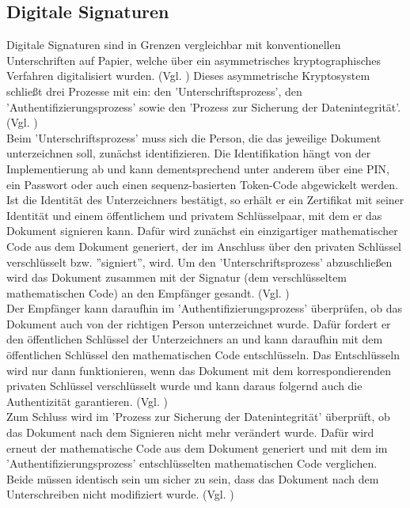 \documentclass[deutsch]{lib/llncs/llncs}
\begin{document}
\subsection{Digitale Signaturen}
Digitale Signaturen sind in Grenzen vergleichbar mit konventionellen Unterschriften auf Papier, welche über ein asymmetrisches kryptographisches Verfahren digitalisiert wurden. (Vgl. \cite[S. 297]{Zitat06}) Dieses asymmetrische Kryptosystem schließt drei Prozesse mit ein: den 'Unterschriftsprozess', den 'Authentifizierungsprozess' sowie den 'Prozess zur Sicherung der Datenintegrität'. (Vgl. \cite[S. 4]{Zitat05}) \\
Beim 'Unterschriftsprozess' muss sich die Person, die das jeweilige Dokument unterzeichnen soll, zunächst identifizieren. Die Identifikation hängt von der Implementierung ab und kann dementsprechend unter anderem über eine PIN, ein Passwort oder auch einen sequenz-basierten Token-Code abgewickelt werden. Ist die Identität des Unterzeichners bestätigt, so erhält er ein Zertifikat mit seiner Identität und einem öffentlichem und privatem Schlüsselpaar, mit dem er das Dokument signieren kann. Dafür wird zunächst ein einzigartiger mathematischer Code aus dem Dokument generiert, der im Anschluss über den privaten Schlüssel verschlüsselt bzw. ''signiert'', wird. Um den 'Unterschriftsprozess' abzuschließen wird das Dokument zusammen mit der Signatur (dem verschlüsseltem mathematischen Code) an den Empfänger gesandt. (Vgl. \cite[S. 4]{Zitat05}) \\
Der Empfänger kann daraufhin im 'Authentifizierungsprozess' überprüfen, ob das Dokument auch von der richtigen Person unterzeichnet wurde. Dafür fordert er den öffentlichen Schlüssel der Unterzeichners an und kann daraufhin mit dem öffentlichen Schlüssel den mathematischen Code entschlüsseln. Das Entschlüsseln wird nur dann funktionieren, wenn das Dokument mit dem korrespondierenden privaten Schlüssel verschlüsselt wurde und kann daraus folgernd auch die Authentizität garantieren. (Vgl. \cite[S. 4]{Zitat05}) \\
Zum Schluss wird im 'Prozess zur Sicherung der Datenintegrität' überprüft, ob das Dokument nach dem Signieren nicht mehr verändert wurde. Dafür wird erneut der mathematische Code aus dem Dokument generiert und mit dem im 'Authentifizierungsprozess' entschlüsselten mathematischen Code verglichen. Beide müssen identisch sein um sicher zu sein, dass das Dokument nach dem Unterschreiben nicht modifiziert wurde.  (Vgl. \cite[S. 4]{Zitat05})
\end{document}
